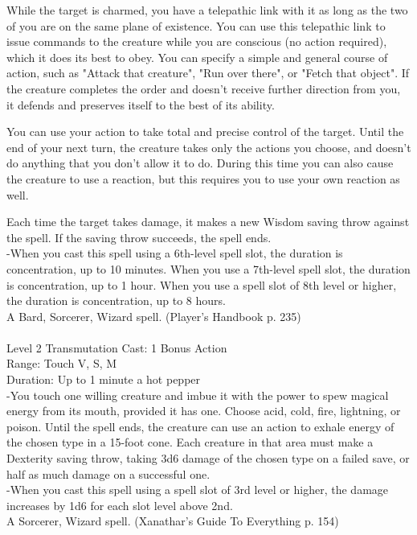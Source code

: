 \documentclass[10pt,twocolumn]{report}
\begin{document}
While the target is charmed, you have a telepathic link with it as long as the two of you are on the same plane of existence. You can use this telepathic link to issue commands to the creature while you are conscious (no action required), which it does its best to obey. You can specify a simple and general course of action, such as "Attack that creature", "Run over there", or "Fetch that object". If the creature completes the order and doesn’t receive further direction from you, it defends and preserves itself to the best of its ability. 

You can use your action to take total and precise control of the target. Until the end of your next turn, the creature takes only the actions you choose, and doesn’t do anything that you don’t allow it to do. During this time you can also cause the creature to use a reaction, but this requires you to use your own reaction as well. 

Each time the target takes damage, it makes a new Wisdom saving throw against the spell. If the saving throw succeeds, the spell ends.\\
-When you cast this spell using a 6th-level spell slot, the duration is concentration, up to 10 minutes. 
When you use a 7th-level spell slot, the duration is concentration, up to 1 hour. 
When you use a spell slot of 8th level or higher, the duration is concentration, up to 8 hours.\\
A Bard, Sorcerer, Wizard spell. (Player's Handbook p. 235) \\


 \\
Level 2 \quad Transmutation \quad Cast: 1 Bonus Action\\
Range: Touch \quad V, S, M\\
Duration: Up to 1 minute \quad a hot pepper\\
-You touch one willing creature and imbue it with the power to spew magical energy from its mouth, provided it has one. Choose acid, cold, fire, lightning, or poison. Until the spell ends, the creature can use an action to exhale energy of the chosen type in a 15-foot cone. Each creature in that area must make a Dexterity saving throw, taking 3d6 damage of the chosen type on a failed save, or half as much damage on a successful one.\\
-When you cast this spell using a spell slot of 3rd level or higher, the damage increases by 1d6 for each slot level above 2nd.\\
A Sorcerer, Wizard spell. (Xanathar's Guide To Everything p. 154) \\
\end{document}
